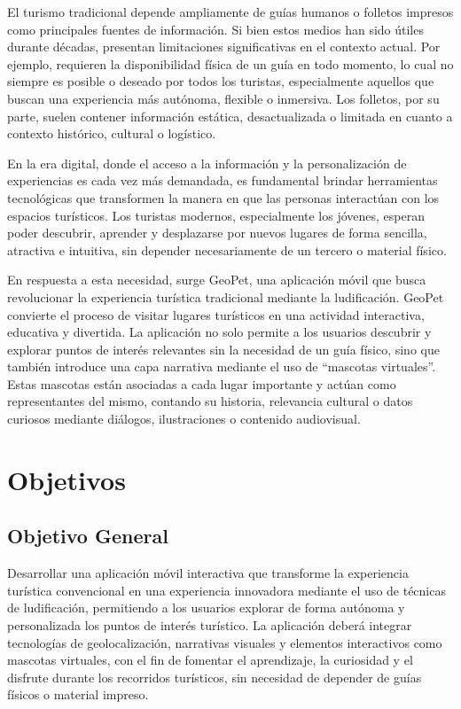 \documentclass[12pt]{article}
\begin{document}
El turismo tradicional depende ampliamente de guías humanos o folletos impresos como principales fuentes de información. Si bien estos medios han sido útiles durante décadas, presentan limitaciones significativas en el contexto actual. Por ejemplo, requieren la disponibilidad física de un guía en todo momento, lo cual no siempre es posible o deseado por todos los turistas, especialmente aquellos que buscan una experiencia más autónoma, flexible o inmersiva. Los folletos, por su parte, suelen contener información estática, desactualizada o limitada en cuanto a contexto histórico, cultural o logístico.

En la era digital, donde el acceso a la información y la personalización de experiencias es cada vez más demandada, es fundamental brindar herramientas tecnológicas que transformen la manera en que las personas interactúan con los espacios turísticos. Los turistas modernos, especialmente los jóvenes, esperan poder descubrir, aprender y desplazarse por nuevos lugares de forma sencilla, atractiva e intuitiva, sin depender necesariamente de un tercero o material físico.

En respuesta a esta necesidad, surge GeoPet, una aplicación móvil que busca revolucionar la experiencia turística tradicional mediante la ludificación. GeoPet convierte el proceso de visitar lugares turísticos en una actividad interactiva, educativa y divertida. La aplicación no solo permite a los usuarios descubrir y explorar puntos de interés relevantes sin la necesidad de un guía físico, sino que también introduce una capa narrativa mediante el uso de “mascotas virtuales”. Estas mascotas están asociadas a cada lugar importante y actúan como representantes del mismo, contando su historia, relevancia cultural o datos curiosos mediante diálogos, ilustraciones o contenido audiovisual.
\section{Objetivos}

\subsection{Objetivo General}

Desarrollar una aplicación móvil interactiva que transforme la experiencia turística convencional en una experiencia innovadora mediante el uso de técnicas de ludificación, permitiendo a los usuarios explorar de forma autónoma y personalizada los puntos de interés turístico. La aplicación deberá integrar tecnologías de geolocalización, narrativas visuales y elementos interactivos como mascotas virtuales, con el fin de fomentar el aprendizaje, la curiosidad y el disfrute durante los recorridos turísticos, sin necesidad de depender de guías físicos o material impreso.
\end{document}
